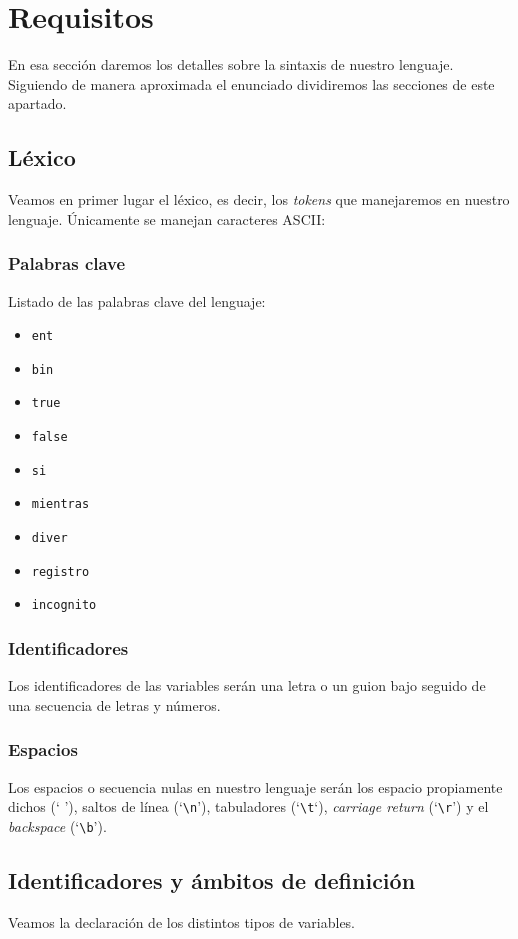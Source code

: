 \chapter*{Requisitos}
En esa sección daremos los detalles sobre la sintaxis de nuestro lenguaje.
Siguiendo de manera aproximada el enunciado dividiremos las secciones de este
apartado.

\section*{Léxico}
Veamos en primer lugar el léxico, es decir, los \textit{tokens} que manejaremos
en nuestro lenguaje. Únicamente se manejan caracteres ASCII:
\subsection*{Palabras clave}
Listado de las palabras clave del lenguaje:
\begin{itemize}
    \item \lstinline{ent}
    \item \lstinline{bin}
    \item \lstinline{true}
    \item \lstinline{false}
    \item \lstinline{si}
    \item \lstinline{mientras}
    \item \lstinline{diver}
    \item \lstinline{registro}
    \item \lstinline{incognito}
\end{itemize}

\subsection*{Identificadores}
Los identificadores de las variables serán una letra o un guion bajo seguido de
una secuencia de letras y números.

\subsection*{Espacios}
Los espacios o secuencia nulas en nuestro lenguaje serán los espacio propiamente
dichos (` '), saltos de línea (`\lstinline{\n}'), tabuladores
(`\lstinline{\t}`), \textit{carriage return} (`\lstinline{\r}') y el
\textit{backspace} (`\lstinline{\b}').

\section*{Identificadores y ámbitos de definición}
Veamos la declaración de los distintos tipos de variables.
